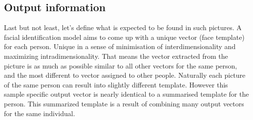 \subsection{Output information}

Last but not least, let's define what is expected to be found in such pictures. A facial identification model aims to come up with a unique vector (face template) for each person. Unique in a sense of minimisation of interdimensionality and maximizing intradimensionality. That means the vector extracted from the picture is as much as possible similar to all other vectors for the same person, and the most different to vector assigned to other people. Naturally each picture of the same person can result into slightly different template. However this sample specific output vector is nearly identical to a summarised template for the person. This summarized template is a result of combining many output vectors for the same individual.
